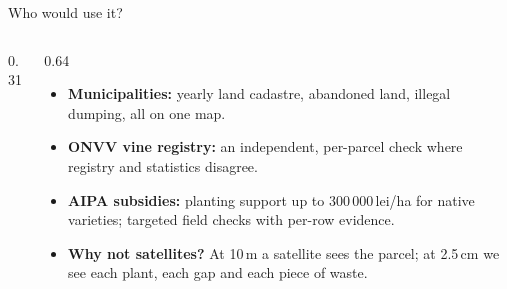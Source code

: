 \begin{frame}{Who would use it?}
  \begin{columns}[T]
    \begin{column}{0.31\textwidth}
      \vspace{3mm}

    \end{column}
    \begin{column}{0.64\textwidth}
      \footnotesize
      \begin{itemize}\setlength{\itemsep}{1.2mm}
        \item \textbf{Municipalities:} yearly land cadastre, abandoned land, illegal dumping, all on one map.
        \item \textbf{ONVV vine registry:} an independent, per-parcel check where registry and statistics disagree.
        \item \textbf{AIPA subsidies:} planting support up to 300\,000\,lei/ha for native varieties; targeted field checks with per-row evidence.
        \item \textbf{Why not satellites?} At 10\,m a satellite sees the parcel; at 2.5\,cm we see each plant, each gap and each piece of waste.
      \end{itemize}
    \end{column}
  \end{columns}
\end{frame}
